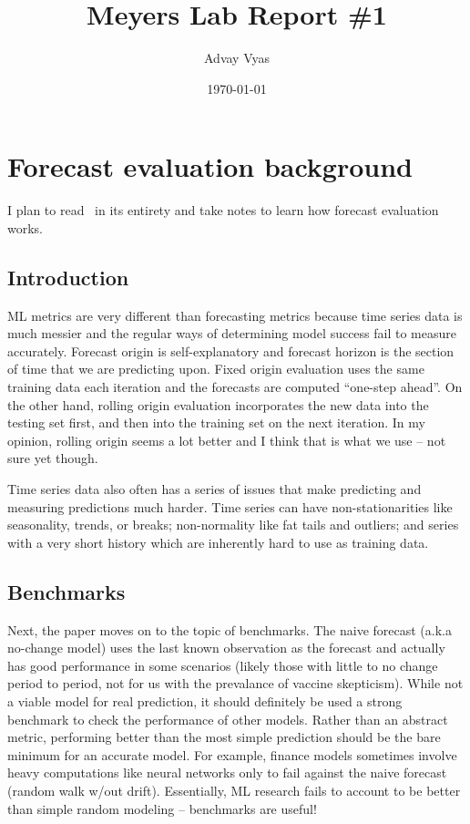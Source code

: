 \documentclass[12pt]{article}
\title{Meyers Lab Report \#1}
\author{Advay Vyas}
\date{\today}
\begin{document}
\maketitle

\tableofcontents
\section{Forecast evaluation background}
I plan to read~\cite{hewamalage23} in its entirety and take notes to learn how forecast evaluation works.
\subsection{Introduction}
ML metrics are very different than forecasting metrics because time series data is much messier and the regular ways of determining model success fail to measure accurately. Forecast origin is self-explanatory and forecast horizon is the section of time that we are predicting upon. Fixed origin evaluation uses the same training data each iteration and the forecasts are computed ``one-step ahead''. On the other hand, rolling origin evaluation incorporates the new data into the testing set first, and then into the training set on the next iteration. In my opinion, rolling origin seems a lot better and I think that is what we use -- not sure yet though. 

Time series data also often has a series of issues that make predicting and measuring predictions much harder. Time series can have non-stationarities like seasonality, trends, or breaks; non-normality like fat tails and outliers; and series with a very short history which are inherently hard to use as training data. 

\subsection{Benchmarks}
Next, the paper moves on to the topic of benchmarks. The naive forecast (a.k.a no-change model) uses the last known observation as the forecast and actually has good performance in some scenarios (likely those with little to no change period to period, not for us with the prevalance of vaccine skepticism). While not a viable model for real prediction, it should definitely be used a strong benchmark to check the performance of other models. Rather than an abstract metric, performing better than the most simple prediction should be the bare minimum for an accurate model. For example, finance models sometimes involve heavy computations like neural networks only to fail against the naive forecast (random walk w/out drift). Essentially, ML research fails to account to be better than simple random modeling -- benchmarks are useful!
\end{document}
